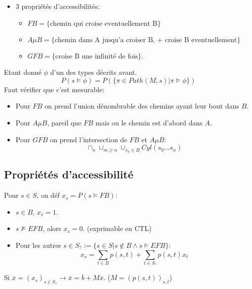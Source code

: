\documentclass[12pt]{article}
\theoremstyle{plain}
\theoremstyle{definition}
\theoremstyle{remark}
\begin{document}
\begin{itemize}
    \item 3 propriétés d'accessibilités:
    \begin{itemize}
        \item $FB=\{\text{chemin qui croise eventuellement B}\}$
        \item $A\mu B=\{\text{chemin dans A jusqu'a croiser B, + croise B eventuellement}\} $
        \item $GFB=\{\text{croise B une infinité de fois}\}$.
    \end{itemize}
\end{itemize}
Etant donné $\phi$ d'un des types décrits avant. 
\[
    P(s\vDash \phi) = P(\{\pi\in Path(M,s)|\pi\vDash\phi\})
\]
Faut vérifier que c'est mesurable:
\begin{itemize}
    \item Pour $FB$ on prend l'union dénombrable des chemins ayant leur bout dans $B$.
    \item Pour $A\mu B$, pareil que $FB$ mais ou le chemin est d'abord dans $A$.
    \item Pour $GFB$ on prend l'intersection de $FB$ et $A\mu B$: 
    \[
        \cap_n\cup_{m\geq n}\cup_{s_n\in B}Cyl(s_0\ldots s_n)
    \]
\end{itemize}

\subsection{Propriétés d'accessibilité}
Pour $s\in S$, on déf $x_s=P(s\vDash FB)$:
\begin{itemize}
    \item $s\in B$, $x_s=1$.
    \item $s\nvDash EFB$, alors $x_s=0$. (exprimable en CTL)
    \item Pour les autres $s\in S_{?}:= \{s\in S| s\notin B \wedge s\vDash EFB\}$:
    \[
        x_s = \sum_{t\in B}p(s,t)+ \sum_{t\in S_{?}}p(s,t)x_t
    \]
\end{itemize}

\noindent Si $\overline{x} = (x_s)_{s\in S_?}\to \overline{x}=\overline{b}+M\overline{x}$. ($M=(p(s,t))_{s,t}$)\\
\end{document}
